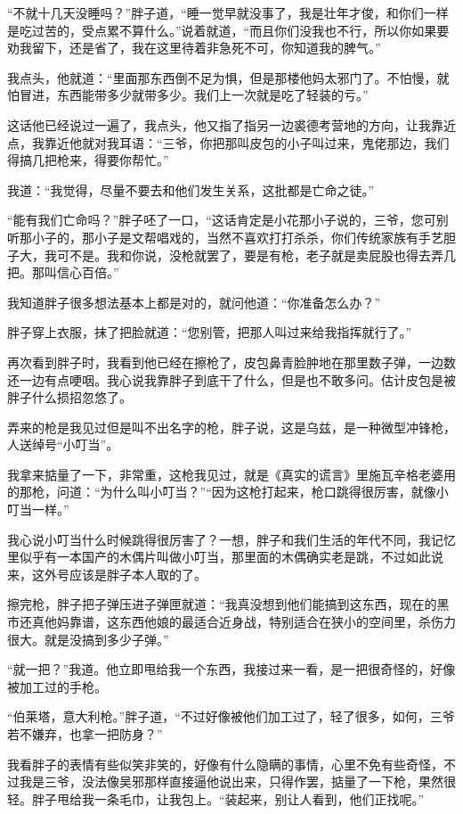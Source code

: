 “不就十几天没睡吗？”胖子道，“睡一觉早就没事了，我是壮年才俊，和你们一样是吃过苦的，受点累不算什么。”说着就道，“而且你们没我也不行，所以你如果要劝我留下，还是省了，我在这里待着非急死不可，你知道我的脾气。”

我点头，他就道：“里面那东西倒不足为惧，但是那楼他妈太邪门了。不怕慢，就怕冒进，东西能带多少就带多少。我们上一次就是吃了轻装的亏。”

这话他已经说过一遍了，我点头，他又指了指另一边裘德考营地的方向，让我靠近点，我靠近他就对我耳语：“三爷，你把那叫皮包的小子叫过来，鬼佬那边，我们得搞几把枪来，得要你帮忙。”

我道：“我觉得，尽量不要去和他们发生关系，这批都是亡命之徒。”

“能有我们亡命吗？”胖子呸了一口，“这话肯定是小花那小子说的，三爷，您可别听那小子的，那小子是文帮唱戏的，当然不喜欢打打杀杀，你们传统家族有手艺胆子大，我可不是。我和你说，没枪就罢了，要是有枪，老子就是卖屁股也得去弄几把。那叫信心百倍。”

我知道胖子很多想法基本上都是对的，就问他道：“你准备怎么办？”

胖子穿上衣服，抹了把脸就道：“您别管，把那人叫过来给我指挥就行了。”

再次看到胖子时，我看到他已经在擦枪了，皮包鼻青脸肿地在那里数子弹，一边数还一边有点哽咽。我心说我靠胖子到底干了什么，但是也不敢多问。估计皮包是被胖子什么损招忽悠了。

弄来的枪是我见过但是叫不出名字的枪，胖子说，这是乌兹，是一种微型冲锋枪，人送绰号“小叮当”。

我拿来掂量了一下，非常重，这枪我见过，就是《真实的谎言》里施瓦辛格老婆用的那枪，问道：“为什么叫小叮当？”“因为这枪打起来，枪口跳得很厉害，就像小叮当一样。”

我心说小叮当什么时候跳得很厉害了？一想，胖子和我们生活的年代不同，我记忆里似乎有一本国产的木偶片叫做小叮当，那里面的木偶确实老是跳，不过如此说来，这外号应该是胖子本人取的了。

擦完枪，胖子把子弹压进子弹匣就道：“我真没想到他们能搞到这东西，现在的黑市还真他妈靠谱，这东西他娘的最适合近身战，特别适合在狭小的空间里，杀伤力很大。就是没搞到多少子弹。”

“就一把？”我道。他立即甩给我一个东西，我接过来一看，是一把很奇怪的，好像被加工过的手枪。

“伯莱塔，意大利枪。”胖子道，“不过好像被他们加工过了，轻了很多，如何，三爷若不嫌弃，也拿一把防身？”

我看胖子的表情有些似笑非笑的，好像有什么隐瞒的事情，心里不免有些奇怪，不过我是三爷，没法像吴邪那样直接逼他说出来，只得作罢，掂量了一下枪，果然很轻。胖子甩给我一条毛巾，让我包上。“装起来，别让人看到，他们正找呢。”

